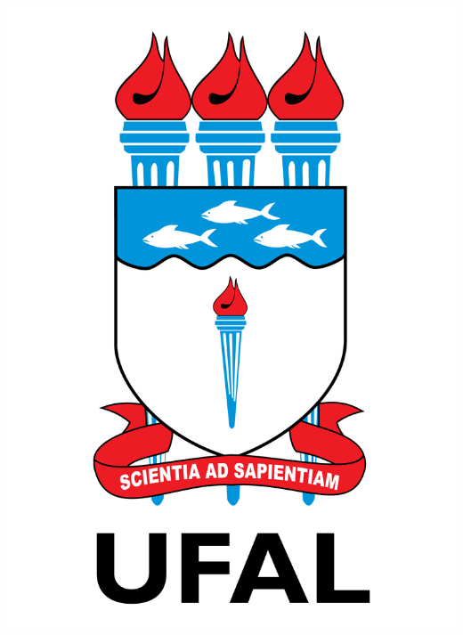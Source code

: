 \documentclass[a0,portrait]{a0poster}
\begin{document}
\begin{center}
\begin{minipage}{0.15\linewidth}
\begin{center}
			\includegraphics[scale=0.3]{../../../../logos/LogoUFAL.png}
		\end{center}
	\end{minipage}
\end{center}

\vspace{0.5cm}
\end{document}
